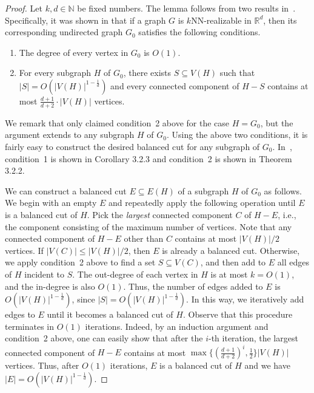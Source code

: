 \documentclass[english]{lipics-v2021}
\begin{document}
\begin{proof}
Let $k,d \in \mathbb{N}$ be fixed numbers.
The lemma follows from two results in~\cite{miller:1997}.
Specifically, it was shown in \cite{miller:1997} that if a graph $G$ is $k$NN-realizable in $\mathbb{R}^d$, then its corresponding undirected graph $G_0$ satisfies the following conditions.
\begin{enumerate}
    \item The degree of every vertex in $G_0$ is $O(1)$.
    \item For every subgraph $H$ of $G_0$, there exists $S \subseteq V(H)$ such that $|S| = O(|V(H)|^{1-\frac{1}{d}})$ and every connected component of $H - S$ contains at most $\frac{d+1}{d+2} \cdot |V(H)|$ vertices.
\end{enumerate}
We remark that \cite{miller:1997} only claimed condition~2 above for the case $H = G_0$, but the argument extends to any subgraph $H$ of $G_0$.
Using the above two conditions, it is fairly easy to construct the desired balanced cut for any subgraph of $G_0$.
In~\cite{miller:1997}, condition~1 is shown in Corollary 3.2.3 and condition~2 is shown in Theorem 3.2.2.

We can construct a balanced cut $E \subseteq E(H)$ of a subgraph $H$ of $G_0$ as follows.
We begin with an empty $E$ and repeatedly apply the following operation until $E$ is a balanced cut of $H$.
Pick the \textit{largest} connected component $C$ of $H-E$, i.e., the component consisting of the maximum number of vertices.
Note that any connected component of $H-E$ other than $C$ contains at most $|V(H)|/2$ vertices.
If $|V(C)| \leq |V(H)|/2$, then $E$ is already a balanced cut.
Otherwise, we apply condition~2 above to find a set $S \subseteq V(C)$, and then add to $E$ all edges of $H$ incident to $S$.
The out-degree of each vertex in $H$ is at most $k = O(1)$, and the in-degree is also $O(1)$.
Thus, the number of edges added to $E$ is $O(|V(H)|^{1-\frac{1}{d}})$, since $|S| = O(|V(H)|^{1-\frac{1}{d}})$.
In this way, we iteratively add edges to $E$ until it becomes a balanced cut of $H$.
Observe that this procedure terminates in $O(1)$ iterations.
Indeed, by an induction argument and condition~2 above, one can easily show that after the $i$-th iteration, the largest connected component of $H-E$ contains at most $\max\{(\frac{d+1}{d+2})^i,\frac{1}{2}\} |V(H)|$ vertices.
Thus, after $O(1)$ iterations, $E$ is a balanced cut of $H$ and we have $|E| = O(|V(H)|^{1-\frac{1}{d}})$.
\end{proof}
\end{document}
